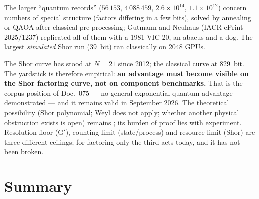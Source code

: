 The larger ``quantum records'' ($56\,153$, $4\,088\,459$, $2.6\times10^{14}$,
$1.1\times10^{12}$) concern numbers of special structure (factors differing in
a few bits), solved by annealing or QAOA after classical pre-processing;
Gutmann and Neuhaus (IACR ePrint 2025/1237) replicated all of them with a 1981
VIC-20, an abacus and a dog. The largest \emph{simulated} Shor run (39~bit)
ran classically on 2048 GPUs.

The Shor curve has stood at $N=21$ since 2012; the classical curve at 829~bit.
The yardstick is therefore empirical: \textbf{an advantage must become visible
on the Shor factoring curve, not on component benchmarks.} That is the corpus
position of Doc.~075 --- no general exponential quantum advantage
demonstrated --- and it remains valid in September 2026. The theoretical
possibility (Shor polynomial; Weyl does not apply; whether another physical
obstruction exists is open) remains \SM; its burden of proof lies
with experiment. Resolution floor (G$'$), counting limit
(state/process) and resource limit (Shor) are three different ceilings; for
factoring only the third acts today, and it has not been broken.


\section{Summary}

